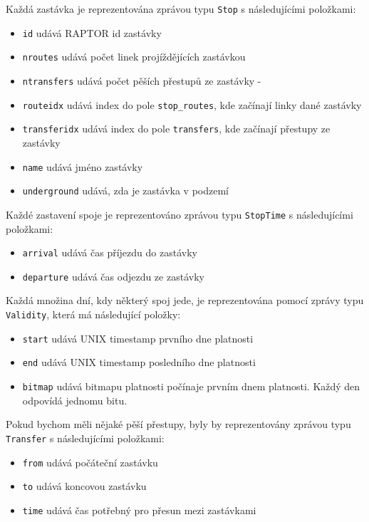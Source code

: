 Každá zastávka je reprezentována zprávou typu {\tt Stop} s následujícími
položkami:
\begin{itemize}
	\item {\tt id} udává RAPTOR id zastávky
	\item {\tt nroutes} udává počet linek projíždějících zastávkou
	\item {\tt ntransfers} udává počet pěších přestupů ze zastávky
	-\item {\tt routeidx} udává index do pole {\tt stop\_routes}, kde
	začínají linky dané zastávky
	\item {\tt transferidx} udává index do pole {\tt transfers}, kde
	začínají přestupy ze zastávky
	\item {\tt name} udává jméno zastávky
	\item {\tt underground} udává, zda je zastávka v podzemí
\end{itemize}
Každé zastavení spoje je reprezentováno zprávou typu {\tt StopTime} s
následujícími položkami:
\begin{itemize}
	\item {\tt arrival} udává čas příjezdu do zastávky
	\item {\tt departure} udává čas odjezdu ze zastávky
\end{itemize}
Každá množina dní, kdy některý spoj jede, je reprezentována pomocí zprávy typu
{\tt Validity}, která má následující položky:
\begin{itemize}
	\item {\tt start} udává UNIX timestamp prvního dne platnosti 
	\item {\tt end} udává UNIX timestamp posledního dne platnosti
	\item {\tt bitmap} udává bitmapu platnosti počínaje prvním dnem
	platnosti. Každý den odpovídá jednomu bitu.
\end{itemize}
Pokud bychom měli nějaké pěší přestupy, byly by reprezentovány zprávou typu {\tt
Transfer} s následujícími položkami:
\begin{itemize}
	\item {\tt from} udává počáteční zastávku
	\item {\tt to} udává koncovou zastávku
	\item {\tt time} udává čas potřebný pro přesun mezi zastávkami
\end{itemize}
